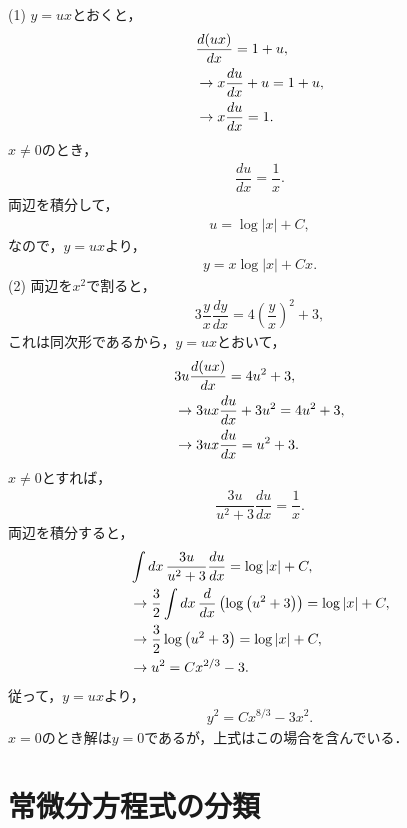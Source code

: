 \noindent
(1) $y=ux$とおくと，
\begin{align}
  &\dfrac{d(ux)}{dx} = 1 + u, \notag \\
  &\rightarrow x\dfrac{du}{dx} + u = 1 + u, \notag \\
  &\rightarrow x\dfrac{du}{dx} = 1. 
\end{align}
$x\neq 0$のとき，
\begin{align}
  \dfrac{du}{dx} = \dfrac{1}{x}. 
\end{align}
両辺を積分して，
\begin{align}
  u = \log \left| x \right| + C,
\end{align}
なので，$y=ux$より，
\begin{align}
  y = x\log \left|x\right| + Cx. 
\end{align}
%
(2) 両辺を$x^2$で割ると，
\begin{align}
  3\dfrac{y}{x}\dfrac{dy}{dx} = 4\left(\dfrac{y}{x}\right)^{2} + 3,
\end{align}
これは同次形であるから，$y=ux$とおいて，
\begin{align}
  & 3u\dfrac{d(ux)}{dx} = 4u^2 + 3, \notag \\
  & \rightarrow 3ux\dfrac{du}{dx} + 3u^2 = 4u^2 + 3, \notag \\
  & \rightarrow 3ux\dfrac{du}{dx} = u^2 + 3. 
\end{align}
$x\neq 0$とすれば，
\begin{align}
  \dfrac{3u}{u^2 + 3}\dfrac{du}{dx} = \dfrac{1}{x}. 
\end{align}
両辺を積分すると，
\begin{align}
 &\int dx\,\dfrac{3u}{u^2 + 3}\dfrac{du}{dx} = \log \left|x\right| + C, \notag\\
 &\rightarrow \dfrac{3}{2}\int dx\, \dfrac{d}{dx}\left(\log \left(u^2 + 3\right)\right) 
              = \log \left|x\right| + C, \notag \\
 &\rightarrow \dfrac{3}{2}\log \left(u^2 + 3\right) = \log \left|x\right| + C, \notag \\
 &\rightarrow u^2 = Cx^{2/3} - 3.
\end{align}
従って，$y=ux$より，
\begin{align}
  y^2 = Cx^{8/3} - 3x^2. 
\end{align}
$x=0$のとき解は$y=0$であるが，上式はこの場合を含んでいる．
%
\newpage
%
%
\section{常微分方程式の分類}

